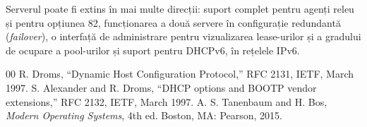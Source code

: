 \documentclass[conference]{IEEEtran}
\begin{document}
Serverul poate fi extins în mai multe direcții: suport complet pentru agenți releu și pentru opțiunea 82, funcționarea a două servere în configurație redundantă (\textit{failover}), o interfață de administrare pentru vizualizarea lease-urilor și a gradului de ocupare a pool-urilor și suport pentru DHCPv6, în rețelele IPv6.

\begin{thebibliography}{00}
 R. Droms, ``Dynamic Host Configuration Protocol,'' RFC 2131, IETF, March 1997.
 S. Alexander and R. Droms, ``DHCP options and BOOTP vendor extensions,'' RFC 2132, IETF, March 1997.
 A. S. Tanenbaum and H. Bos, \emph{Modern Operating Systems}, 4th ed. Boston, MA: Pearson, 2015.
\end{thebibliography}
\end{document}
